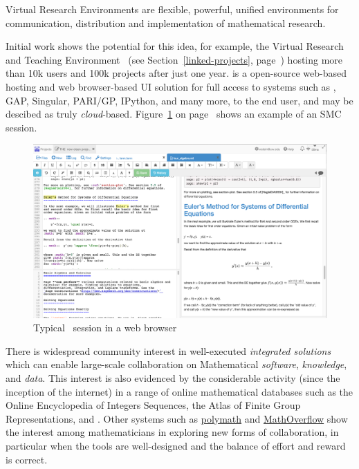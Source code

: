 
Virtual Research Environments are flexible, powerful, unified
environments for communication, distribution and implementation of
mathematical research.

Initial work shows the potential for this idea, for example, the
Virtual Research and Teaching Environment \SMC\ 
(see Section~\ref{linked-projects},  page~\pageref{sec:SMC-page})
hosting more than 10k users and 100k projects after just one year.  
\SMC is a open-source web-based hosting and web browser-based UI
solution for full access to systems such as \Sage, GAP, Singular, PARI/GP, IPython, and many
more, to the end user, and may be descibed as truly \emph{cloud}-based. 
Figure~\ref{fig:SMC-screenshot} on page~\pageref{fig:SMC-screenshot} shows an example of an SMC session.
\begin{figure}
\includegraphics[scale=0.2]{Pictures/SMC-screenshot.png}
\caption{\label{fig:SMC-screenshot} Typical \SMC\ session in a web browser} 
\end{figure}

There is widespread community interest in well-executed
\emph{integrated solutions} which can enable large-scale collaboration
on Mathematical \emph{software}, \emph{knowledge}, and
\emph{data}. This interest is also evidenced by the considerable
activity (since the inception of the internet) in a range of online
mathematical databases such as the Online Encyclopedia of Integers
Sequences, the Atlas of Finite Group Representations, and \LMFDB.
%
Other systems such as \href{http://polymathprojects.org/}{polymath}
and \href{mathoverflow.net}{MathOverflow} show the interest among
mathematicians in exploring new forms of collaboration, in particular
when the tools are well-designed and the balance of effort and reward
is correct.

